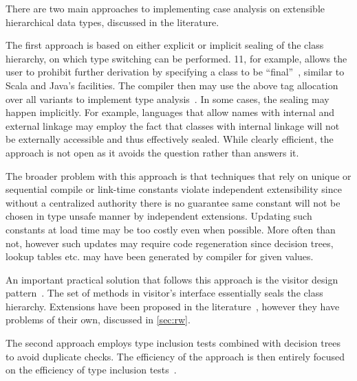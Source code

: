 \noindent
There are two main approaches to implementing case analysis on extensible 
hierarchical data types, discussed in the literature.

The first approach is based on either explicit or implicit sealing of the class 
hierarchy, on which type switching can be performed. \Cpp{}11, for example, allows 
the user to prohibit further derivation by specifying a class to be ``final''~\cite{C++11}, 
similar to Scala and Java's facilities. The compiler then may use the above tag 
allocation over all variants to implement type analysis~\cite[.2]{EmirThesis}. 
In some cases, the sealing may happen implicitly. For example, languages that 
allow names with internal and external linkage may employ the fact that classes 
with internal linkage will not be externally accessible and thus effectively 
sealed. While clearly efficient, the approach is not open as it avoids the 
question rather than answers it. 

The broader problem with this approach is that techniques that rely on unique or
sequential compile or link-time constants violate independent extensibility 
since without a centralized authority there is no guarantee same constant will 
not be chosen in type unsafe manner by independent extensions. Updating such 
constants at load time may be too costly even when possible. More often than 
not, however such updates may require code regeneration since decision trees, 
lookup tables etc. may have been generated by compiler for given values.

An important practical solution that follows this approach is the visitor design 
pattern~\cite{DesignPatterns1993}. The set of  methods in visitor's 
interface essentially seals the class hierarchy. Extensions have been proposed 
in the literature~\cite{Zenger:2001}, however they have problems of their own, 
discussed in \textsection\ref{sec:rw}.

The second approach employs type inclusion tests combined with decision 
trees~\cite{Cardelli84} to avoid duplicate checks. The efficiency of the 
approach is then entirely focused on the efficiency of type inclusion 
tests~\cite{Schubert83,Wirth88,Cohen91,Caseau93,Vortex96,Krall97nearoptimal,Vitek97,PQEncoding,FastDynCast,Ducournau08}.


